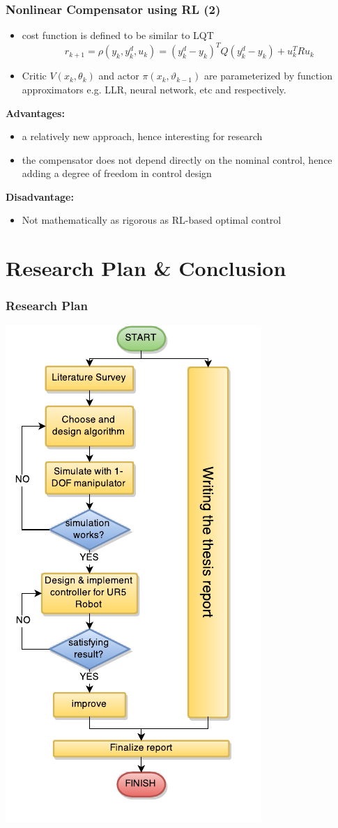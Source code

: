 \documentclass{beamer}
\begin{document}
			\begin{frame}\frametitle{Nonlinear Compensator using RL (2)}
				\vspace{3mm}
				\fontsize{8}{4}\selectfont 
				\begin{itemize}
					\item cost function is defined to be similar to LQT
					\begin{equation}
					r_{k+1} = \rho(y_k, y^d_k, u_k) = (y^d_k - y_k)^TQ(y^d_k - y_k) + u_k^TRu_k
					\end{equation}
					\item Critic $V(x_k,\theta_k)$ and actor $\pi(x_k,\vartheta_{k-1})$ are parameterized by function approximators e.g. LLR, neural network, etc and  respectively.
				\end{itemize}
				\vspace{4mm}
				\textbf{Advantages:}
				\begin{itemize}
					\item a relatively new approach, hence interesting for research
					\item the compensator does not depend directly on the nominal control, hence adding a degree of freedom in control design 
				\end{itemize}
				\vspace{2mm}
				\textbf{Disadvantage:}
				\begin{itemize}
					\item Not mathematically as rigorous as RL-based optimal control 
				\end{itemize}
			\end{frame}											
			
			\section{Research Plan \& Conclusion}			
			\begin{frame}\frametitle{Research Plan}
				\begin{center}
					\includegraphics[width=0.35\linewidth]{images/research_plan}
				\end{center}
			\end{frame}
\end{document}
